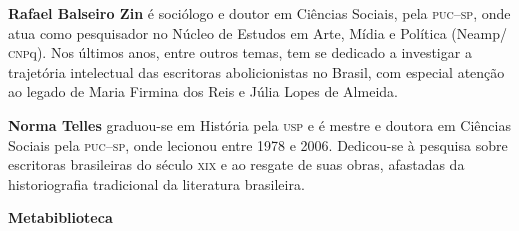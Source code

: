 \textbf{Rafael Balseiro Zin} é sociólogo e doutor em Ciências Sociais, pela \textsc{puc--sp}, onde atua como pesquisador no Núcleo de Estudos em Arte, Mídia e Política (Neamp/\,\textsc{cnp}q). Nos últimos anos, entre outros temas, tem se dedicado a investigar a trajetória intelectual das escritoras abolicionistas no Brasil, com especial atenção ao legado de Maria Firmina dos Reis e Júlia Lopes de Almeida.

\textbf{Norma Telles} graduou-se em História pela \textsc{usp} e é mestre e doutora em Ciências Sociais pela \textsc{puc--sp}, onde lecionou entre 1978 e 2006. Dedicou-se à pesquisa sobre escritoras brasileiras do século \textsc{xix} e ao resgate de suas obras, afastadas da historiografia tradicional da literatura brasileira. 

\textbf{Metabiblioteca} \par


